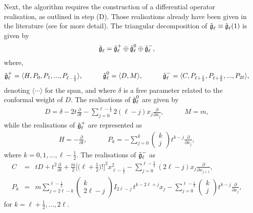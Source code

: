 \documentclass[12pt]{article}
\begin{document}
Next, the algorithm requires the construction of a differential operator
realisation, as outlined in step (D).  Those realisations already have
been given in the literature (see \cite{Ai13} for more detail).  The triangular
decomposition of $\mathfrak{\Hat{g}}_\ell \equiv \mathfrak{\Hat{g}}_\ell(1)$  is given by 
 \begin{eqnarray*}
	 \mathfrak{\Hat{g}}_\ell=\mathfrak{\Hat{g}}^+_{\ell} \oplus
	 \mathfrak{\Hat{g}}^0_{\ell} \oplus  \mathfrak{\Hat{g}}^-_{\ell}, 
\end{eqnarray*}
where, 
\begin{eqnarray*}
	\mathfrak{\Hat{g}}^+_{\ell}=\langle H, P_0, P_1, . . .,
	P_{\ell-\frac{1}{2}}\rangle,  \quad\qquad
	\mathfrak{\Hat{g}}^0_{\ell}=\langle D,  M\rangle,\quad\qquad
	\mathfrak{\Hat{g}}^-_{\ell}=\langle C, P_{\ell+\frac{1}{2}}, P_{\ell+\frac{3}{2}}, . . ., P_{2\ell}\rangle,
\end{eqnarray*}
denoting $\langle\cdots\rangle$ for the span, and where $\delta$ is a free
parameter related to the conformal weight of $D$.
The realisations of $\mathfrak{\Hat{g}}^0_{\ell}$ are given by 
\begin{eqnarray}
D=\delta-2t\frac{\partial}{\partial t}-\sum\limits_{j=0}^{\ell-\frac{1}{2}}2(\ell-j)x_{j}\frac{\partial}{\partial x_{j}},  \quad\qquad M=m,
\end{eqnarray}
while the realisations of $\mathfrak{\Hat{g}}^+_{\ell}$ are represented as 
\begin{eqnarray}
H=-\frac{\partial}{\partial t},  \quad\qquad  P_k=-\sum\limits_{j=0}^{k} \left(
     \begin{array}{c}
       k \\
       j
     \end{array}
   \right)t^{k-j}\frac{\partial}{\partial x_{j}}, 
\end{eqnarray} 
 where  $k=0, 1, . . . , \ell-\frac{1}{2}$. The realisations of
 $\mathfrak{\Hat{g}}^-_{\ell}$ as 
\begin{eqnarray}
C&=&t D +t^2\frac{\partial}{\partial t}+\frac{m}{2}\Bigg[ \Big( \ell +\frac{1}{2} \Big)! \Bigg]^2x^2_{\ell-\frac{1}{2}}-\sum\limits_{j=0}^{\ell-\frac{3}{2}}(2\ell-j)x_{j}\frac{\partial}{\partial x_{j+1}},\\
 P_k&=&m\sum\limits_{j=2\ell-k}^{\ell-\frac{1}{2}}\left(
     \begin{array}{c}
       k \\
       2\ell-j  
     \end{array}
   \right)I_{2\ell-j} \, t^{k-2\ell+j} x_{j}-\sum\limits_{j=0}^{\ell-\frac{1}{2}} \left(
     \begin{array}{c}
       k \\
       j
     \end{array}
   \right)t^{k-j}\frac{\partial}{\partial x_{j}}, 
\end{eqnarray}
for  $k=\ell+\frac{1}{2}, \ldots , 2\ell$.
\end{document}
